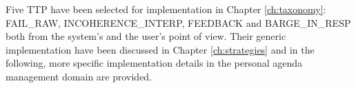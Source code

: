 		
		Five TTP have been selected for implementation in Chapter \ref{ch:taxonomy}:  FAIL\_RAW, INCOHERENCE\_INTERP, FEEDBACK and BARGE\_IN\_RESP both from the system's and the user's point of view. Their generic implementation have been discussed in Chapter \ref{ch:strategies} and in the following, more specific implementation details in the personal agenda management domain are provided.
    
    
